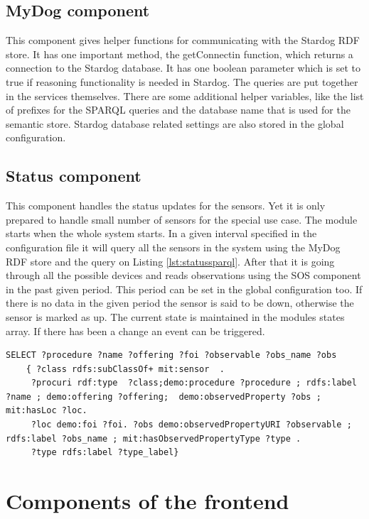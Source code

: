 \subsection{MyDog component}
This component gives helper functions for communicating with the Stardog RDF store. It has one important method, the getConnectin function, which returns a connection to the Stardog database. It has one boolean parameter which is set to true if reasoning functionality is needed in Stardog. The queries are put together in the services themselves. There are some additional helper variables, like the list of prefixes for the SPARQL queries and the database name that is used for the semantic store. Stardog database related settings are also stored in the global configuration.

\subsection{Status component}
This component handles  the status updates for the sensors. Yet it is only prepared to handle small number of sensors for the special use case. The module starts when the whole system starts. 
In a given interval specified in the configuration file it will query all the sensors in the system using the MyDog RDF store and the query on Listing \ref{lst:statussparql}.
After that it is going through all the possible devices and reads observations using the SOS component in the past given period. This period can be set in the global configuration too. 
If there is no data in the given period the sensor is said to be down, otherwise the sensor is marked as up. The current state is maintained in the modules states array. If there has been a change an event can be triggered.
\begin{lstlisting}[caption={SPARQL query for querying all sensors\label{lst:statussparql}}]
SELECT ?procedure ?name ?offering ?foi ?observable ?obs_name ?obs 
    { ?class rdfs:subClassOf+ mit:sensor  .
     ?procuri rdf:type  ?class;demo:procedure ?procedure ; rdfs:label ?name ; demo:offering ?offering;  demo:observedProperty ?obs ; mit:hasLoc ?loc.
     ?loc demo:foi ?foi. ?obs demo:observedPropertyURI ?observable ; rdfs:label ?obs_name ; mit:hasObservedPropertyType ?type .
     ?type rdfs:label ?type_label}
\end{lstlisting}

\section{Components of the frontend}

